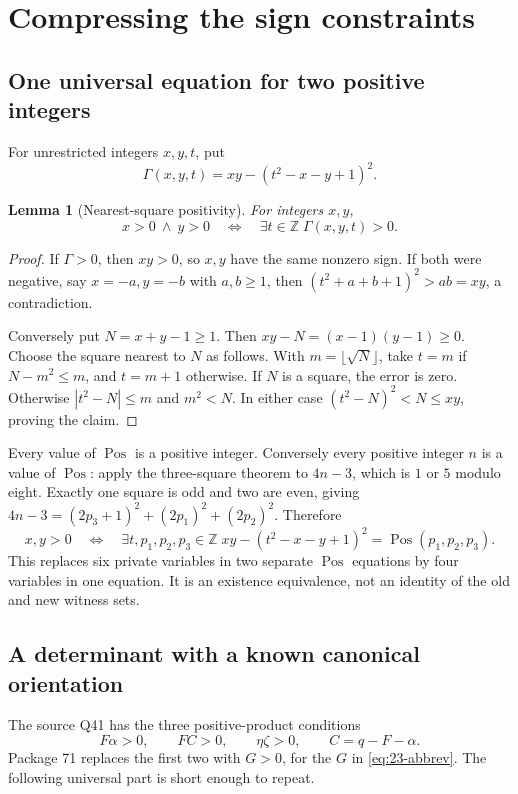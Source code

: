 \documentclass[11pt]{article}
\newtheorem{lemma}[theorem]{Lemma}
\newcommand{\Z}{\mathbb Z}
\newcommand{\Pos}{\operatorname{Pos}}
\begin{document}
\section{Compressing the sign constraints}
\label{sec:guards}
\subsection{One universal equation for two positive integers}
For unrestricted integers $x,y,t$, put
\[
 \Gamma(x,y,t)=xy-(t^2-x-y+1)^2.
\]
\begin{lemma}[Nearest-square positivity]\label{lem:pair}
For integers $x,y$,
\[
 x>0\ \wedge\ y>0
 \quad\Longleftrightarrow\quad
 \exists t\in\Z\;\Gamma(x,y,t)>0.
\]
\end{lemma}
\begin{proof}
If $\Gamma>0$, then $xy>0$, so $x,y$ have the same nonzero sign. If both
were negative, say $x=-a,y=-b$ with $a,b\ge1$, then
$(t^2+a+b+1)^2>ab=xy$, a contradiction.

Conversely put $N=x+y-1\ge1$. Then $xy-N=(x-1)(y-1)\ge0$.
Choose the square nearest to $N$ as follows. With $m=\lfloor\sqrt N\rfloor$,
take $t=m$ if $N-m^2\le m$, and $t=m+1$ otherwise. If $N$ is a square,
the error is zero. Otherwise $|t^2-N|\le m$ and $m^2<N$.
In either case $(t^2-N)^2<N\le xy$, proving the claim.
\end{proof}
Every value of $\Pos$ is a positive integer. Conversely every positive
integer $n$ is a value of $\Pos$: apply the three-square theorem to
$4n-3$, which is $1$ or $5$ modulo eight. Exactly one square is odd and
two are even, giving
$4n-3=(2p_3+1)^2+(2p_1)^2+(2p_2)^2$.
Therefore
\begin{equation}\label{eq:pairguard}
 x,y>0\quad\Longleftrightarrow\quad
 \exists t,p_1,p_2,p_3\in\Z\;
 xy-(t^2-x-y+1)^2=\Pos(p_1,p_2,p_3).
\end{equation}
This replaces six private variables in two separate $\Pos$ equations by
four variables in one equation. It is an existence equivalence, not an
identity of the old and new witness sets.

\subsection{A determinant with a known canonical orientation}
The source Q41 has the three positive-product conditions
\[
 F\alpha>0,\qquad FC>0,\qquad\eta\zeta>0,
 \qquad C=q-F-\alpha.
\]
Package 71 replaces the first two with $G>0$, for the $G$ in
\eqref{eq:23-abbrev}. The following universal part is short enough to repeat.
\end{document}
